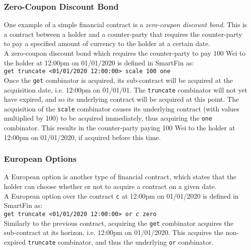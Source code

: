 \documentclass{article}
\begin{document}
\subsubsection{Zero-Coupon Discount Bond}

One example of a simple financial contract is a \textit{zero-coupon discount bond}. This is a contract between a holder and a counter-party that requires the counter-party to pay a specified amount of currency to the holder at a certain date. \\

A zero-coupon discount bond which requires the counter-party to pay 100 Wei to the holder at 12:00pm on 01/01/2020 is defined in SmartFin as: \\

\texttt{get truncate <01/01/2020 12:00:00> scale 100 one} \\

Once the \texttt{get} combinator is acquired, its sub-contract will be acquired at the acquisition date, i.e. 12:00pm on 01/01/01. The \texttt{truncate} combinator will not yet have expired, and so its underlying contract will be acquired at this point. The acquisition of the \texttt{scale} combinator causes its underlying contract (with values multiplied by 100) to be acquired immediately, thus acquiring the \texttt{one} combinator. This results in the counter-party paying 100 Wei to the holder at 12:00pm on 01/01/2020, if acquired before this time.


\subsubsection{European Options}

A European option is another type of financial contract, which states that the holder can choose whether or not to acquire a contract on a given date. \\

A European option over the contract \texttt{c} at 12:00pm on 01/01/2020 is defined in SmartFin as: \\

\texttt{get truncate <01/01/2020 12:00:00> or \textit{c} zero} \\

Similarly to the previous contract, acquiring the \texttt{get} combinator acquires the sub-contract at its horizon, i.e. 12:00pm on 01/01/2020. This acquires the non-expired \texttt{truncate} combinator, and thus the underlying \texttt{or} combinator. \\
\end{document}
